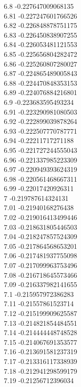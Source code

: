 {6.8	-0.227647009068135\\
6.81	-0.227247601766526\\
6.82	-0.226848878751175\\
6.83	-0.226450838907255\\
6.84	-0.226053481121553\\
6.85	-0.225656804282472\\
6.86	-0.225260807280027\\
6.87	-0.224865489005843\\
6.88	-0.224470848353153\\
6.89	-0.224076884216801\\
6.9	-0.223683595493234\\
6.91	-0.223290981080503\\
6.92	-0.222899039878264\\
6.93	-0.222507770787771\\
6.94	-0.22211717271188\\
6.95	-0.221727244555043\\
6.96	-0.221337985223309\\
6.97	-0.220949393624319\\
6.98	-0.220561468667311\\
6.99	-0.22017420926311\\
7	-0.219787614324131\\
7.01	-0.21940168276438\\
7.02	-0.219016413499446\\
7.03	-0.218631805446503\\
7.04	-0.218247857524309\\
7.05	-0.217864568653201\\
7.06	-0.217481937755098\\
7.07	-0.217099963753496\\
7.08	-0.216718645573466\\
7.09	-0.216337982141655\\
7.1	-0.215957972386283\\
7.11	-0.21557861523714\\
7.12	-0.215199909625587\\
7.13	-0.214821854484551\\
7.14	-0.214444448748528\\
7.15	-0.214067691353577\\
7.16	-0.213691581237319\\
7.17	-0.213316117338939\\
7.18	-0.212941298599179\\
7.19	-0.21256712396034\\
}
